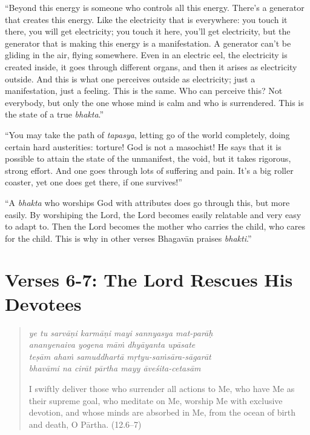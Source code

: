 \documentclass[12pt, twoside, openright]{memoir}
\begin{document}
\enquote{Beyond this energy is someone who controls all this energy. There’s a generator that creates this energy. Like the electricity that is everywhere: you touch it there, you will get electricity; you touch it here, you’ll get electricity, but the generator that is making this energy is a manifestation. A generator can’t be gliding in the air, flying somewhere. Even in an electric eel, the electricity is created inside, it goes through different organs, and then it arises as electricity outside. And this is what one perceives outside as electricity; just a manifestation, just a feeling. This is the same. Who can perceive this? Not everybody, but only the one whose mind is calm and who is surrendered. This is the state of a true \textit{bhakta}.}

\enquote{You may take the path of \textit{tapasya}, letting go of the world completely, doing certain hard austerities: torture! God is not a masochist! He says that it is possible to attain the state of the unmanifest, the void, but it takes rigorous, strong effort. And one goes through lots of suffering and pain. It’s a big roller coaster, yet one does get there, if one survives!}

\enquote{A \textit{bhakta} who worships God with attributes does go through this, but more easily. By worshiping the Lord, the Lord becomes easily relatable and very easy to adapt to. Then the Lord becomes the mother who carries the child, who cares for the child. This is why in other verses Bhagavān praises \textit{bhakti}.}

\newpage
\section{Verses 6-7: The Lord Rescues His Devotees}\label{sec-verses-6-7-the-lord-rescues-his-devotees}


\par
\begin{verse}
\textit{ye tu sarvāṇi karmāṇi mayi sannyasya mat-parāḥ} \\
\textit{ananyenaiva yogena māṁ dhyāyanta upāsate} \\
\textit{teṣām ahaṁ samuddhartā mṛtyu-saṁsāra-sāgarāt} \\
\textit{bhavāmi na cirāt pārtha mayy āveśita-cetasām}

\noindent I swiftly deliver those who surrender all actions to Me, who have Me as their supreme goal, who meditate on Me, worship Me with exclusive devotion, and whose minds are absorbed in Me, from the ocean of birth and death, O Pārtha. (12.6–7)
\end{verse}
\par
\end{document}
